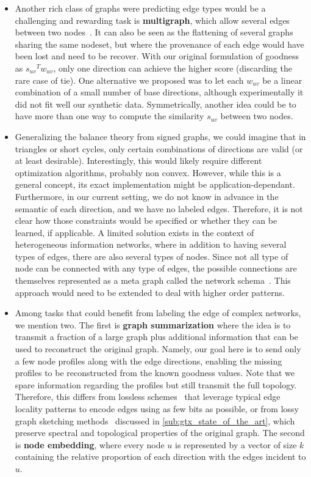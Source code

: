 \begin{itemize}[leftmargin=*]
  \item Another rich class of graphs were predicting edge types would be a challenging and rewarding
    task is \textbf{multigraph}, which allow several edges between two
    nodes~\autocite{typedMultigraph11}. It can also be seen as
    the flattening of several graphs sharing the same nodeset, but where the provenance of each edge
    would have been lost and need to be recover. With our original formulation of goodness as
    ${s_{uv}}^T w_{uv}$, only one direction can achieve the higher score (discarding the rare case
    of tie). One alternative we proposed was to let each $w_{uv}$ be a linear combination of a small
    number of base directions, although experimentally it did not fit well our synthetic data.
    Symmetrically, another idea could be to have more than one way to compute the similarity
    $s_{uv}$ between two nodes.

  \item Generalizing the balance theory from signed graphs, we could imagine that in triangles or
    short cycles, only certain combinations of directions are valid (or at least desirable).
    Interestingly, this would likely require different optimization algorithms, probably non convex.
    However, while this is a general concept, its exact implementation might be
    application-dependant. Furthermore, in our current setting, we do not know in advance in the
    semantic of each direction, and we have no labeled edges. Therefore, it is not clear how those
    constraints would be specified or whether they can be learned, if applicable. A limited solution
    exists in the context of heterogeneous information networks, where in addition to having several
    types of edges, there are also several types of nodes. Since not all type of node can be
    connected with any type of edges, the possible connections are themselves represented as a meta
    graph called the network schema~\autocite[Definition 3]{HINSurvey17}. This approach would need
    to be extended to deal with higher order patterns.

  \item Among tasks that could benefit from labeling the edge of complex networks, we mention two.
    The first is \textbf{graph summarization} where the idea is to transmit a fraction of a large
    graph plus additional information that can be used to reconstruct the original graph. Namely,
    our goal here is to send only a few node profiles along with the edge directions, enabling the
    missing profiles to be reconstructed from the known goodness values. Note that we spare
    information regarding the profiles but still transmit the full topology. Therefore, this differs
    from lossless schemes~\autocites{compressSN09}{compressSN12} that leverage typical edge locality
    patterns to encode edges using as few bits as possible, or from lossy graph sketching
    methods~\autocite{graphSketch12} discussed in \autoref{sub:gtx_state_of_the_art}, which preserve
    spectral and topological properties of the original graph.
    The second is \textbf{node embedding}, where every node $u$ is represented by a vector of size
    $k$ containing the relative proportion of each direction with the edges incident to $u$.
\end{itemize}
